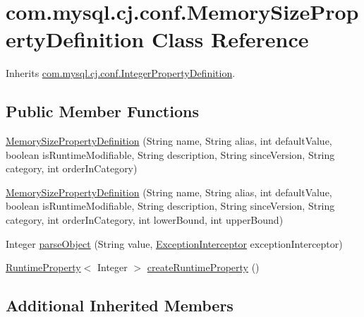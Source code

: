 \hypertarget{classcom_1_1mysql_1_1cj_1_1conf_1_1_memory_size_property_definition}{}\section{com.\+mysql.\+cj.\+conf.\+Memory\+Size\+Property\+Definition Class Reference}
\label{classcom_1_1mysql_1_1cj_1_1conf_1_1_memory_size_property_definition}


Inherits \mbox{\hyperlink{classcom_1_1mysql_1_1cj_1_1conf_1_1_integer_property_definition}{com.\+mysql.\+cj.\+conf.\+Integer\+Property\+Definition}}.

\subsection*{Public Member Functions}
\begin{DoxyCompactItemize}
\item 
\mbox{\hyperlink{classcom_1_1mysql_1_1cj_1_1conf_1_1_memory_size_property_definition_a6d51c5f196e83ceb3dd72b5b393cd5a7}{Memory\+Size\+Property\+Definition}} (String name, String alias, int default\+Value, boolean is\+Runtime\+Modifiable, String description, String since\+Version, String category, int order\+In\+Category)
\item 
\mbox{\hyperlink{classcom_1_1mysql_1_1cj_1_1conf_1_1_memory_size_property_definition_aa3db29de8990cf47c44f2b505ce59183}{Memory\+Size\+Property\+Definition}} (String name, String alias, int default\+Value, boolean is\+Runtime\+Modifiable, String description, String since\+Version, String category, int order\+In\+Category, int lower\+Bound, int upper\+Bound)
\item 
Integer \mbox{\hyperlink{classcom_1_1mysql_1_1cj_1_1conf_1_1_memory_size_property_definition_a4fcf50ad05ab3a481e1a067927541afe}{parse\+Object}} (String value, \mbox{\hyperlink{interfacecom_1_1mysql_1_1cj_1_1exceptions_1_1_exception_interceptor}{Exception\+Interceptor}} exception\+Interceptor)
\item 
\mbox{\hyperlink{interfacecom_1_1mysql_1_1cj_1_1conf_1_1_runtime_property}{Runtime\+Property}}$<$ Integer $>$ \mbox{\hyperlink{classcom_1_1mysql_1_1cj_1_1conf_1_1_memory_size_property_definition_af5bd3b81a694d07152eb314e85a7015b}{create\+Runtime\+Property}} ()
\end{DoxyCompactItemize}
\subsection*{Additional Inherited Members}


